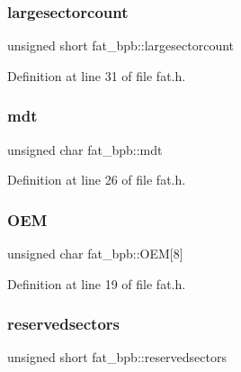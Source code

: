 \subsubsection{\texorpdfstring{largesectorcount}{largesectorcount}}
{\footnotesize\ttfamily unsigned short fat\+\_\+bpb\+::largesectorcount}



Definition at line 31 of file fat.\+h.

\mbox{\label{structfat__bpb_a238908353debb66f7bf5e1da634a394b_a238908353debb66f7bf5e1da634a394b}} 
\subsubsection{\texorpdfstring{mdt}{mdt}}
{\footnotesize\ttfamily unsigned char fat\+\_\+bpb\+::mdt}



Definition at line 26 of file fat.\+h.

\mbox{\label{structfat__bpb_a1ea9743362295df1f3354a68fb30db97_a1ea9743362295df1f3354a68fb30db97}} 
\subsubsection{\texorpdfstring{O\+EM}{OEM}}
{\footnotesize\ttfamily unsigned char fat\+\_\+bpb\+::\+O\+EM\mbox{[}8\mbox{]}}



Definition at line 19 of file fat.\+h.

\mbox{\label{structfat__bpb_ab9240f9a3403f33a95ccf401d5352262_ab9240f9a3403f33a95ccf401d5352262}} 
\subsubsection{\texorpdfstring{reservedsectors}{reservedsectors}}
{\footnotesize\ttfamily unsigned short fat\+\_\+bpb\+::reservedsectors}



